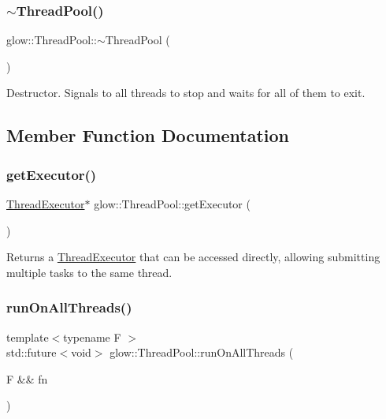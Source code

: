 \subsubsection{\texorpdfstring{$\sim$\+Thread\+Pool()}{~ThreadPool()}}
{\footnotesize\ttfamily glow\+::\+Thread\+Pool\+::$\sim$\+Thread\+Pool (\begin{DoxyParamCaption}{ }\end{DoxyParamCaption})}

Destructor. Signals to all threads to stop and waits for all of them to exit. 

\subsection{Member Function Documentation}
\mbox{\label{classglow_1_1_thread_pool_a1da371b53981316f8e0ebd66efd43cd1}} 
\subsubsection{\texorpdfstring{get\+Executor()}{getExecutor()}}
{\footnotesize\ttfamily \hyperlink{classglow_1_1_thread_executor}{Thread\+Executor}$\ast$ glow\+::\+Thread\+Pool\+::get\+Executor (\begin{DoxyParamCaption}{ }\end{DoxyParamCaption})\hspace{0.3cm}{\ttfamily [inline]}}

Returns a \hyperlink{classglow_1_1_thread_executor}{Thread\+Executor} that can be accessed directly, allowing submitting multiple tasks to the same thread. \mbox{\label{classglow_1_1_thread_pool_ac75f4d3a956beb63705644d9b867a45a}} 
\subsubsection{\texorpdfstring{run\+On\+All\+Threads()}{runOnAllThreads()}}
{\footnotesize\ttfamily template$<$typename F $>$ \\
std\+::future$<$void$>$ glow\+::\+Thread\+Pool\+::run\+On\+All\+Threads (\begin{DoxyParamCaption}\item[{F \&\&}]{fn }\end{DoxyParamCaption})\hspace{0.3cm}{\ttfamily [inline]}}

